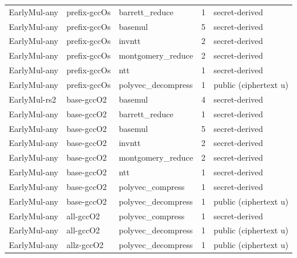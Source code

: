 \begin{tabular}{lllrl}
EarlyMul-any & prefix-gccOs & barrett\_reduce & 1 & secret-derived \\
EarlyMul-any & prefix-gccOs & basemul & 5 & secret-derived \\
EarlyMul-any & prefix-gccOs & invntt & 2 & secret-derived \\
EarlyMul-any & prefix-gccOs & montgomery\_reduce & 2 & secret-derived \\
EarlyMul-any & prefix-gccOs & ntt & 1 & secret-derived \\
EarlyMul-any & prefix-gccOs & polyvec\_decompress & 1 & public (ciphertext u) \\
EarlyMul-rs2 & base-gccO2 & basemul & 4 & secret-derived \\
EarlyMul-any & base-gccO2 & barrett\_reduce & 1 & secret-derived \\
EarlyMul-any & base-gccO2 & basemul & 5 & secret-derived \\
EarlyMul-any & base-gccO2 & invntt & 2 & secret-derived \\
EarlyMul-any & base-gccO2 & montgomery\_reduce & 2 & secret-derived \\
EarlyMul-any & base-gccO2 & ntt & 1 & secret-derived \\
EarlyMul-any & base-gccO2 & polyvec\_compress & 1 & secret-derived \\
EarlyMul-any & base-gccO2 & polyvec\_decompress & 1 & public (ciphertext u) \\
EarlyMul-any & all-gccO2 & polyvec\_compress & 1 & secret-derived \\
EarlyMul-any & all-gccO2 & polyvec\_decompress & 1 & public (ciphertext u) \\
EarlyMul-any & allz-gccO2 & polyvec\_decompress & 1 & public (ciphertext u) \\
\bottomrule
\end{tabular}
